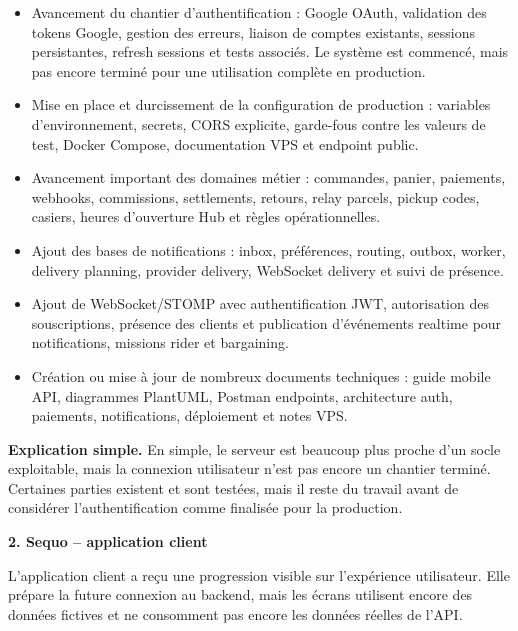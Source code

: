 \documentclass[11pt,letterpaper]{article}
\newcommand{\subsectiontitle}[1]{%
  \vspace{0.35em}
  {\large\bfseries\color{SequoInk}#1}\par
}
\newcommand{\simpleexplanation}[1]{%
  {\small\textbf{\color{SequoBlue}Explication simple.} \color{SequoMuted}#1\par}
}
\begin{document}
\begin{itemize}
  \item Avancement du chantier d'authentification : Google OAuth, validation des tokens Google, gestion des erreurs, liaison de comptes existants, sessions persistantes, refresh sessions et tests associés. Le système est commencé, mais pas encore terminé pour une utilisation complète en production.
  \item Mise en place et durcissement de la configuration de production : variables d'environnement, secrets, CORS explicite, garde-fous contre les valeurs de test, Docker Compose, documentation VPS et endpoint public.
  \item Avancement important des domaines métier : commandes, panier, paiements, webhooks, commissions, settlements, retours, relay parcels, pickup codes, casiers, heures d'ouverture Hub et règles opérationnelles.
  \item Ajout des bases de notifications : inbox, préférences, routing, outbox, worker, delivery planning, provider delivery, WebSocket delivery et suivi de présence.
  \item Ajout de WebSocket/STOMP avec authentification JWT, autorisation des souscriptions, présence des clients et publication d'événements realtime pour notifications, missions rider et bargaining.
  \item Création ou mise à jour de nombreux documents techniques : guide mobile API, diagrammes PlantUML, Postman endpoints, architecture auth, paiements, notifications, déploiement et notes VPS.
\end{itemize}

\simpleexplanation{En simple, le serveur est beaucoup plus proche d'un socle exploitable, mais la connexion utilisateur n'est pas encore un chantier terminé. Certaines parties existent et sont testées, mais il reste du travail avant de considérer l'authentification comme finalisée pour la production.}

\subsectiontitle{2. Sequo -- application client}
L'application client a reçu une progression visible sur l'expérience utilisateur. Elle prépare la future connexion au backend, mais les écrans utilisent encore des données fictives et ne consomment pas encore les données réelles de l'API.
\end{document}
